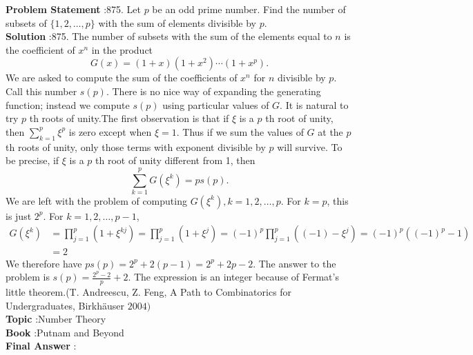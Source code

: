 \documentclass[10pt]{article}
\begin{document}
\textbf{Problem Statement} :875. Let $p$ be an odd prime number. Find the number of subsets of $\{1,2, \ldots, p\}$ with the sum of elements divisible by $p$.\\
\textbf{Solution} :875. The number of subsets with the sum of the elements equal to $n$ is the coefficient of $x^{n}$ in the product$$ G(x)=(1+x)\left(1+x^{2}\right) \cdots\left(1+x^{p}\right) . $$We are asked to compute the sum of the coefficients of $x^{n}$ for $n$ divisible by $p$. Call this number $s(p)$. There is no nice way of expanding the generating function; instead we compute $s(p)$ using particular values of $G$. It is natural to try $p$ th roots of unity.The first observation is that if $\xi$ is a $p$ th root of unity, then $\sum_{k=1}^{p} \xi^{p}$ is zero except when $\xi=1$. Thus if we sum the values of $G$ at the $p$ th roots of unity, only those terms with exponent divisible by $p$ will survive. To be precise, if $\xi$ is a $p$ th root of unity different from 1, then$$ \sum_{k=1}^{p} G\left(\xi^{k}\right)=p s(p) . $$We are left with the problem of computing $G\left(\xi^{k}\right), k=1,2, \ldots, p$. For $k=p$, this is just $2^{p}$. For $k=1,2, \ldots, p-1$,$$ \begin{aligned} G\left(\xi^{k}\right) &=\prod_{j=1}^{p}\left(1+\xi^{k j}\right)=\prod_{j=1}^{p}\left(1+\xi^{j}\right)=(-1)^{p} \prod_{j=1}^{p}\left((-1)-\xi^{j}\right)=(-1)^{p}\left((-1)^{p}-1\right) \\ &=2 \end{aligned} $$We therefore have $p s(p)=2^{p}+2(p-1)=2^{p}+2 p-2$. The answer to the problem is $s(p)=\frac{2^{p}-2}{p}+2$. The expression is an integer because of Fermat's little theorem.(T. Andreescu, Z. Feng, A Path to Combinatorics for Undergraduates, Birkhäuser $2004)$\\
\textbf{Topic} :Number Theory\\
\textbf{Book} :Putnam and Beyond\\
\textbf{Final Answer} :\\
\end{document}
